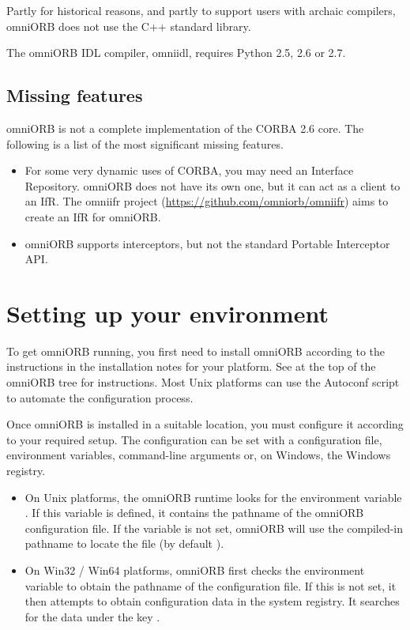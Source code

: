 \documentclass[11pt,oneside,a4paper]{book}
\begin{document}
Partly for historical reasons, and partly to support users with
archaic compilers, omniORB does not use the C++ standard library.

The omniORB IDL compiler, omniidl, requires Python 2.5, 2.6 or 2.7.


\subsection{Missing features}
\label{sec:missing}

omniORB is not a complete implementation of the CORBA 2.6 core.  The
following is a list of the most significant missing features.

\begin{itemize}

\item For some very dynamic uses of CORBA, you may need an Interface
  Repository. omniORB does not have its own one, but it can act as a
  client to an IfR. The omniifr project
  (\url{https://github.com/omniorb/omniifr}) aims to create an IfR
  for omniORB.

\item omniORB supports interceptors, but not the standard Portable
Interceptor API.

\end{itemize}



\section{Setting up your environment}
\label{sec:setup}

To get omniORB running, you first need to install omniORB according to
the instructions in the installation notes for your platform. See
 at the top of the omniORB tree for
instructions. Most Unix platforms can use the Autoconf
 script to automate the configuration process.

Once omniORB is installed in a suitable location, you must configure
it according to your required setup. The configuration can be set with
a configuration file, environment variables, command-line arguments
or, on Windows, the Windows registry.

\begin{itemize}

\item On Unix platforms, the omniORB runtime looks for the environment
  variable . If this variable is defined, it
  contains the pathname of the omniORB configuration file. If the
  variable is not set, omniORB will use the compiled-in pathname to
  locate the file (by default ).

\item On Win32 / Win64 platforms, omniORB first checks the environment
  variable  to obtain the pathname of the
  configuration file. If this is not set, it then attempts to obtain
  configuration data in the system registry. It searches for the data
  under the key .

\end{itemize}
\end{document}

